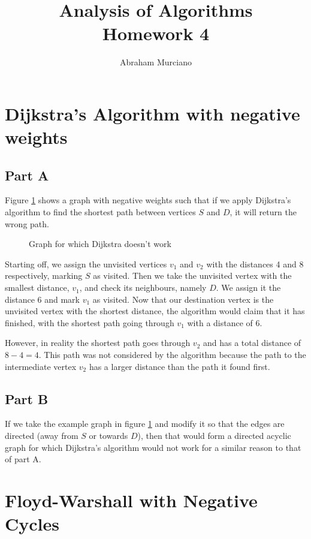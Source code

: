 \documentclass{article}
\title{Analysis of Algorithms \\
\medskip
\large Homework 4}
\author{Abraham Murciano}
\begin{document}
\maketitle

\section{Dijkstra's Algorithm with negative weights}

\subsection*{Part A}

Figure \ref{q1a} shows a graph with negative weights such that if we apply Dijkstra's algorithm to find the shortest path between vertices \(S\) and \(D\), it will return the wrong path.

\begin{figure}[h]
	\centering
	\caption{Graph for which Dijkstra doesn't work}
	\label{q1a}
\end{figure}

Starting off, we assign the unvisited vertices \(v_1\) and \(v_2\) with the distances 4 and 8 respectively, marking \(S\) as visited. Then we take the unvisited vertex with the smallest distance, \(v_1\), and check its neighbours, namely \(D\). We assign it the distance 6 and mark \(v_1\) as visited. Now that our destination vertex is the unvisited vertex with the shortest distance, the algorithm would claim that it has finished, with the shortest path going through \(v_1\) with a distance of 6.

However, in reality the shortest path goes through \(v_2\) and has a total distance of \(8 - 4 = 4\). This path was not considered by the algorithm because the path to the intermediate vertex \(v_2\) has a larger distance than the path it found first.

\subsection*{Part B}

If we take the example graph in figure \ref{q1a} and modify it so that the edges are directed (away from \(S\) or towards \(D\)), then that would form a directed acyclic graph for which Dijkstra's algorithm would not work for a similar reason to that of part A.

\section{Floyd-Warshall with Negative Cycles}

\end{document}
